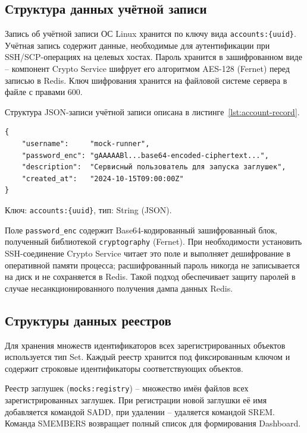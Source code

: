 \subsection{Структура данных учётной записи}

Запись об учётной записи ОС Linux хранится по ключу вида \texttt{accounts:\{uuid\}}. Учётная запись содержит данные, необходимые для аутентификации при SSH/SCP-операциях на целевых хостах. Пароль хранится в зашифрованном виде -- компонент Crypto Service шифрует его алгоритмом AES-128 (Fernet) перед записью в Redis. Ключ шифрования хранится на файловой системе сервера в файле с правами 600.

Структура JSON-записи учётной записи описана в листинге~\ref{lst:account-record}.

\begin{listing}[H]
\caption{Структура JSON-записи учётной записи в Redis}
\label{lst:account-record}
\begin{verbatim}
{
    "username":     "mock-runner",
    "password_enc": "gAAAAABl...base64-encoded-ciphertext...",
    "description":  "Сервисный пользователь для запуска заглушек",
    "created_at":   "2024-10-15T09:00:00Z"
}
\end{verbatim}
\end{listing}

Ключ: \texttt{accounts:\{uuid\}}, тип: String (JSON).

Поле \texttt{password\_enc} содержит Base64-кодированный зашифрованный блок, полученный библиотекой \texttt{cryptography} (Fernet). При необходимости установить SSH-соединение Crypto Service читает это поле и выполняет дешифрование в оперативной памяти процесса; расшифрованный пароль никогда не записывается на диск и не сохраняется в Redis. Такой подход обеспечивает защиту паролей в случае несанкционированного получения дампа данных Redis.

\subsection{Структуры данных реестров}

Для хранения множеств идентификаторов всех зарегистрированных объектов используется тип Set. Каждый реестр хранится под фиксированным ключом и содержит строковые идентификаторы соответствующих объектов.

Реестр заглушек (\texttt{mocks:registry}) -- множество имён файлов всех зарегистрированных заглушек. При регистрации новой заглушки её имя добавляется командой SADD, при удалении -- удаляется командой SREM. Команда SMEMBERS возвращает полный список для формирования Dashboard.


